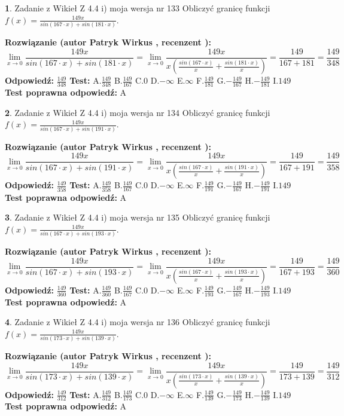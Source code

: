 \documentclass[12pt, a4paper]{article}
\theoremstyle{definition} %
\newtheorem{zad}{}
\newcommand{\zadStart}[1]{\begin{zad}#1\newline}
\newcommand{\zadStop}{\end{zad}}
\newcommand{\rozwStart}[2]{\noindent \textbf{Rozwiązanie (autor #1 , recenzent #2): }\newline}
\newcommand{\rozwStop}{\newline}
\newcommand{\odpStart}{\noindent \textbf{Odpowiedź:}\newline}
\newcommand{\odpStop}{\newline}
\newcommand{\testStart}{\noindent \textbf{Test:}\newline}
\newcommand{\testStop}{\newline}
\newcommand{\kluczStart}{\noindent \textbf{Test poprawna odpowiedź:}\newline}
\newcommand{\kluczStop}{\newline}
\begin{document}
\zadStart{Zadanie z Wikieł Z 4.4 i) moja wersja nr 133}
Obliczyć granicę funkcji $f(x)=\frac{149x}{sin(167\cdot x) +sin(181\cdot x)}$.
\zadStop
\rozwStart{Patryk Wirkus}{}
$$\lim\limits_{x\to 0}\frac{149x}{sin(167\cdot x) +sin(181\cdot x)}=\lim\limits_{x\to 0}\frac{149x}{x(\frac{sin(167\cdot x)}{x}+\frac{sin(181\cdot x)}{x})}=\frac{149}{167+181} = \frac{149}{348}$$
\rozwStop
\odpStart
$\frac{149}{348}$
\odpStop
\testStart
A.$\frac{149}{348}$
B.$\frac{149}{167}$
C.$0$
D.$-\infty$
E.$\infty$
F.$\frac{149}{181}$
G.$-\frac{149}{167}$
H.$-\frac{149}{181}$
I.$149$
\testStop
\kluczStart
A
\kluczStop



\zadStart{Zadanie z Wikieł Z 4.4 i) moja wersja nr 134}
Obliczyć granicę funkcji $f(x)=\frac{149x}{sin(167\cdot x) +sin(191\cdot x)}$.
\zadStop
\rozwStart{Patryk Wirkus}{}
$$\lim\limits_{x\to 0}\frac{149x}{sin(167\cdot x) +sin(191\cdot x)}=\lim\limits_{x\to 0}\frac{149x}{x(\frac{sin(167\cdot x)}{x}+\frac{sin(191\cdot x)}{x})}=\frac{149}{167+191} = \frac{149}{358}$$
\rozwStop
\odpStart
$\frac{149}{358}$
\odpStop
\testStart
A.$\frac{149}{358}$
B.$\frac{149}{167}$
C.$0$
D.$-\infty$
E.$\infty$
F.$\frac{149}{191}$
G.$-\frac{149}{167}$
H.$-\frac{149}{191}$
I.$149$
\testStop
\kluczStart
A
\kluczStop



\zadStart{Zadanie z Wikieł Z 4.4 i) moja wersja nr 135}
Obliczyć granicę funkcji $f(x)=\frac{149x}{sin(167\cdot x) +sin(193\cdot x)}$.
\zadStop
\rozwStart{Patryk Wirkus}{}
$$\lim\limits_{x\to 0}\frac{149x}{sin(167\cdot x) +sin(193\cdot x)}=\lim\limits_{x\to 0}\frac{149x}{x(\frac{sin(167\cdot x)}{x}+\frac{sin(193\cdot x)}{x})}=\frac{149}{167+193} = \frac{149}{360}$$
\rozwStop
\odpStart
$\frac{149}{360}$
\odpStop
\testStart
A.$\frac{149}{360}$
B.$\frac{149}{167}$
C.$0$
D.$-\infty$
E.$\infty$
F.$\frac{149}{193}$
G.$-\frac{149}{167}$
H.$-\frac{149}{193}$
I.$149$
\testStop
\kluczStart
A
\kluczStop



\zadStart{Zadanie z Wikieł Z 4.4 i) moja wersja nr 136}
Obliczyć granicę funkcji $f(x)=\frac{149x}{sin(173\cdot x) +sin(139\cdot x)}$.
\zadStop
\rozwStart{Patryk Wirkus}{}
$$\lim\limits_{x\to 0}\frac{149x}{sin(173\cdot x) +sin(139\cdot x)}=\lim\limits_{x\to 0}\frac{149x}{x(\frac{sin(173\cdot x)}{x}+\frac{sin(139\cdot x)}{x})}=\frac{149}{173+139} = \frac{149}{312}$$
\rozwStop
\odpStart
$\frac{149}{312}$
\odpStop
\testStart
A.$\frac{149}{312}$
B.$\frac{149}{173}$
C.$0$
D.$-\infty$
E.$\infty$
F.$\frac{149}{139}$
G.$-\frac{149}{173}$
H.$-\frac{149}{139}$
I.$149$
\testStop
\kluczStart
A
\kluczStop
\end{document}
